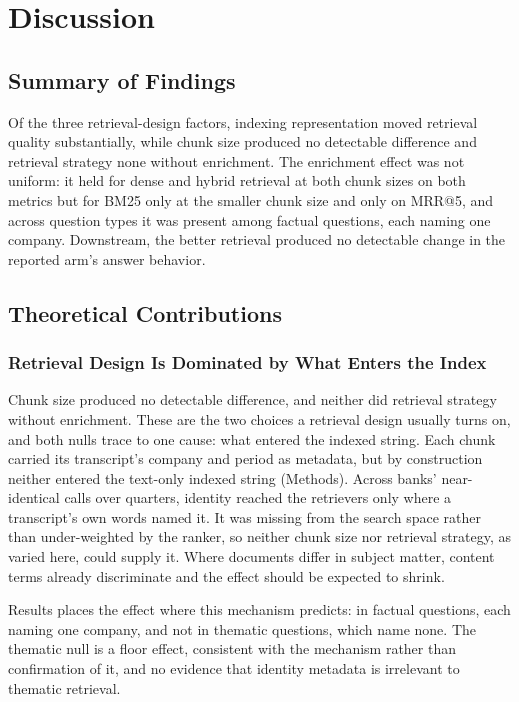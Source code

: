 \chapter{Discussion}

\section{Summary of Findings}

Of the three retrieval-design factors, indexing representation moved retrieval
quality substantially, while chunk size produced no detectable difference and
retrieval strategy none without enrichment. The enrichment effect was not
uniform: it held for dense and hybrid retrieval at both chunk sizes on both
metrics but for BM25 only at the smaller chunk size and only on MRR@5, and
across question types it was present among factual questions, each naming one
company. Downstream, the better retrieval produced no detectable change in the
reported arm's answer behavior.

\section{Theoretical Contributions}

\subsection{Retrieval Design Is Dominated by What Enters the Index}

Chunk size produced no detectable difference, and neither did retrieval
strategy without enrichment. These are the two choices a retrieval design
usually turns on, and both nulls trace to one cause: what entered the indexed
string. Each chunk carried its transcript's company and period as metadata, but
by construction neither entered the text-only indexed string (Methods). Across
\thesisNumCompanies{} banks' near-identical calls over \thesisNumQuarters{}
quarters, identity reached the retrievers only where a transcript's own words
named it. It was missing from the search space rather than under-weighted by
the ranker, so neither chunk size nor retrieval strategy, as varied here, could
supply it. Where documents
differ in subject matter, content terms already discriminate and the effect
should be expected to shrink.

Results places the effect where this mechanism predicts: in factual questions,
each naming one company, and not in thematic questions, which name none. The
thematic null is a floor effect, consistent with the mechanism rather than
confirmation of it, and no evidence that identity metadata is irrelevant to
thematic retrieval.

